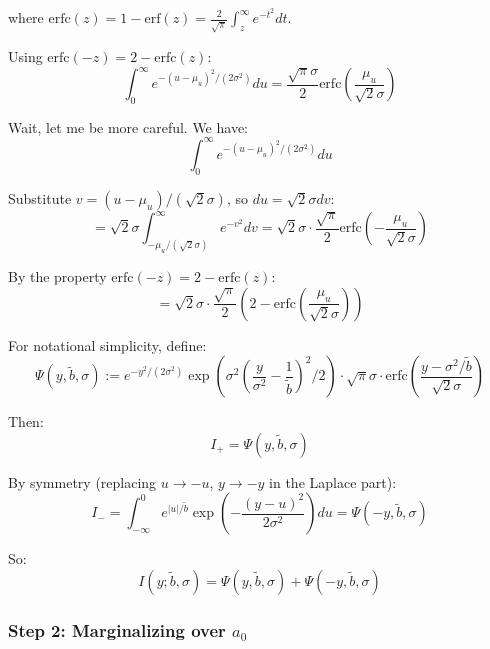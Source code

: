 \documentclass[11pt,a4paper]{article}
\theoremstyle{plain}
\theoremstyle{definition}
\begin{document}
where $\text{erfc}(z) = 1 - \text{erf}(z) = \frac{2}{\sqrt{\pi}}\int_z^\infty e^{-t^2}dt$.

Using $\text{erfc}(-z) = 2 - \text{erfc}(z)$:
\begin{equation}
\int_0^\infty e^{-(u-\mu_u)^2/(2\sigma^2)} du = \frac{\sqrt{\pi}\sigma}{2}\text{erfc}\left(\frac{\mu_u}{\sqrt{2}\sigma}\right)
\end{equation}

Wait, let me be more careful. We have:
\begin{equation}
\int_0^\infty e^{-(u-\mu_u)^2/(2\sigma^2)} du
\end{equation}

Substitute $v = (u-\mu_u)/(\sqrt{2}\sigma)$, so $du = \sqrt{2}\sigma dv$:
\begin{equation}
= \sqrt{2}\sigma \int_{-\mu_u/(\sqrt{2}\sigma)}^\infty e^{-v^2} dv = \sqrt{2}\sigma \cdot \frac{\sqrt{\pi}}{2}\text{erfc}\left(-\frac{\mu_u}{\sqrt{2}\sigma}\right)
\end{equation}

By the property $\text{erfc}(-z) = 2 - \text{erfc}(z)$:
\begin{equation}
= \sqrt{2}\sigma \cdot \frac{\sqrt{\pi}}{2}\left(2 - \text{erfc}\left(\frac{\mu_u}{\sqrt{2}\sigma}\right)\right)
\end{equation}

For notational simplicity, define:
\begin{equation}
\Psi(y, \tilde{b}, \sigma) := e^{-y^2/(2\sigma^2)}\exp\left(\sigma^2\left(\frac{y}{\sigma^2}-\frac{1}{\tilde{b}}\right)^2/2\right) \cdot \sqrt{\pi}\sigma \cdot \text{erfc}\left(\frac{y-\sigma^2/\tilde{b}}{\sqrt{2}\sigma}\right)
\end{equation}

Then:
\begin{equation}
I_+ = \Psi(y, \tilde{b}, \sigma)
\end{equation}

By symmetry (replacing $u \to -u$, $y \to -y$ in the Laplace part):
\begin{equation}
I_- = \int_{-\infty}^0 e^{|u|/\tilde{b}}\exp\left(-\frac{(y-u)^2}{2\sigma^2}\right) du = \Psi(-y, \tilde{b}, \sigma)
\end{equation}

So:
\begin{equation}
I(y; \tilde{b}, \sigma) = \Psi(y, \tilde{b}, \sigma) + \Psi(-y, \tilde{b}, \sigma)
\end{equation}

\subsubsection{Step 2: Marginalizing over $a_0$}
\end{document}
